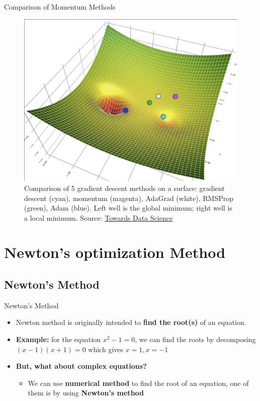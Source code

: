 \documentclass[serif, aspectratio=169]{beamer}
\begin{document}
\begin{frame}{Comparison of Momentum Methods}
    \centering
    \begin{figure}
        \centering
        \includegraphics[width=0.5\linewidth]{pic/comparison.jpg}
        \caption{\footnotesize Comparison of 5 gradient descent methods on a surface: gradient descent (cyan), momentum (magenta), AdaGrad (white), RMSProp (green), Adam (blue). Left well is the global minimum; right well is a local minimum. Source: \href{https://towardsdatascience.com/a-visual-explanation-of-gradient-descent-methods-momentum-adagrad-rmsprop-adam-f898b102325c}{Towards Data Science}}
    \end{figure}
\end{frame}

\section{Newton's optimization Method}
\subsection{Newton's Method}
\begin{frame}{Newton's Method}
\begin{itemize}
    \item Newton method is originally intended to \textbf{find the root(s)} of an equation.
    \item \textbf{Example:} for the equation $x^2 - 1 = 0$, we can find the roots by decomposing $(x-1)(x+1)=0$ which gives $x=1, x=-1$
    \item \textbf{But, what about complex equations?}
    \begin{itemize}
        \item We can use \textbf{numerical method} to find the root of an equation, one of them is by using \textbf{Newton’s method}
    \end{itemize}
\end{itemize}
\end{frame}
\end{document}
